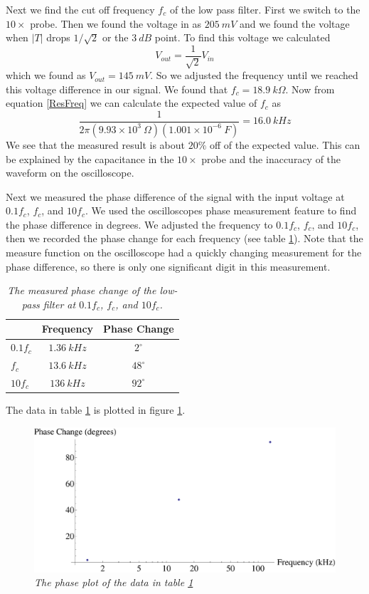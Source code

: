 \documentclass[11pt]{article}
\numberwithin{equation}{section}
\numberwithin{figure}{section}
\numberwithin{table}{section}
\begin{document}
Next we find the cut off frequency $f_c$ of the low pass filter. First we switch to the $10\times$ probe. Then we found the voltage in as $205\ mV$ and we found the voltage when $|T|$ drops $1/\sqrt{2}$ or the $3\ dB$ point. To find this voltage we calculated 
$$V_{out} = \frac{1}{\sqrt{2}}V_{in}$$
which we found as $V_{out} = 145\ mV$. So we adjusted the frequency until we reached this voltage difference in our signal. We found that $f_c = 18.9\ k\Omega$. Now from equation \ref{ResFreq} we can calculate the expected value of $f_c$ as
$$\frac{1}{2\pi(9.93\times10^{3}\ \Omega)(1.001\times10^{-6}\ F)} = 16.0\ kHz$$
We see that the measured result is about $20\%$ off of the expected value. This can be explained by the capacitance in the $10\times$ probe and the inaccuracy of the waveform on the oscilloscope.

Next we measured the phase difference of the signal with the input voltage at $0.1f_c$, $f_c$, and $10f_c$. We used the oscilloscopes phase measurement feature to find the phase difference in degrees. We adjusted the frequency to $0.1f_c$, $f_c$, and $10f_c$, then we recorded the phase change for each frequency (see table \ref{LowPassPhase}). Note that the measure function on the oscilloscope had a quickly changing measurement for the phase difference, so there is only one significant digit in this measurement.
\begin{table}[h]
\centering
\begin{tabular}{lcc}
		&Frequency	&Phase Change	\\
\hline
$0.1f_c$	&$1.36\ kHz$	&$2^{\circ}$\\
$f_c$		&$13.6\ kHz$	&$48^{\circ}$\\
$10f_c$		&$136\ kHz$	&$92^{\circ}$\\
\end{tabular}
\caption{\textit{The measured phase change of the low-pass filter at $0.1f_c$, $f_c$, and $10f_c$.}}
\label{LowPassPhase}
\end{table}
The data in table \ref{LowPassPhase} is plotted in figure \ref{PlotLowPassPhase}.
\begin{figure}[h]
\centering
\includegraphics[scale=0.60]{PlotLowPassPhase.eps}
\caption{\textit{The phase plot of the data in table \ref{LowPassPhase}}}
\label{PlotLowPassPhase}
\end{figure}
\end{document}
